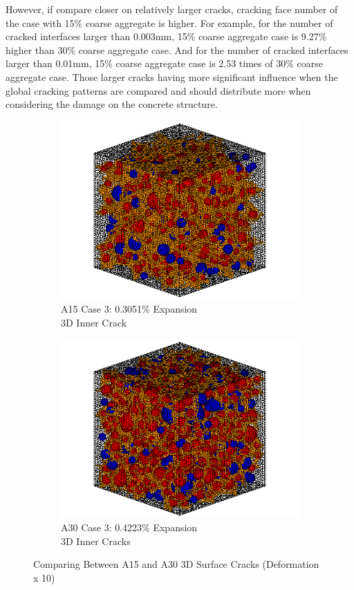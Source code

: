 However, if compare closer on relatively larger cracks, cracking face number of the case with 15\% coarse aggregate is higher. For example, for the number of cracked interfaces larger than 0.003mm, 15\% coarse aggregate case is 9.27\% higher than 30\% coarse aggregate case. And for the number of cracked interfaces larger than 0.01mm, 15\% coarse aggregate case is 2.53 times of 30\% coarse aggregate case.  Those larger cracks having more significant influence when the global cracking patterns are compared and should distribute more when considering the damage on the concrete structure.
\begin{figure}[h!]
\centering

    \begin{subfigure}{.5\textwidth}
      \centering
      \includegraphics[width=.8\linewidth]{Files/exp_3D/ASR/A15P75_3_c.png}
    \caption{A15 Case 3: 0.3051\% Expansion \\ 3D Inner Crack}
    \end{subfigure}%
    \begin{subfigure}{.5\textwidth}
      \centering
      \includegraphics[width=.8\linewidth]{Files/exp_3D/ASR/A30P75_3_c.png}
    \caption{A30 Case 3: 0.4223\% Expansion \\ 3D Inner Cracks}
    \end{subfigure}

  \caption{Comparing Between A15 and A30 3D Surface Cracks (Deformation x 10)}
  \label{fig:ASR_A15vsA30P75_3D}
\end{figure}
